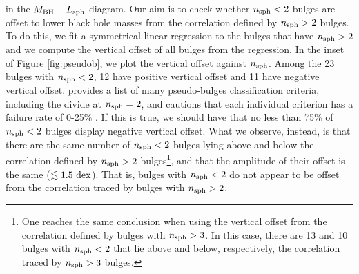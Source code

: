 \documentclass[preprint2]{emulateapj}
\begin{document}
in the $M_{\rm BH} - L_{\rm sph}$ diagram.
Our aim is to check whether $n_{\rm sph}<2$ bulges 
are offset to lower black hole masses from the correlation defined by $n_{\rm sph}>2$ bulges. 
To do this, we fit a symmetrical linear regression to the bulges that have $n_{\rm sph}>2$ 
and we compute the vertical offset of all bulges from the regression. 
In the inset of Figure \ref{fig:pseudob}, we plot the vertical offset against $n_{\rm sph}$. 
Among the 23 bulges with $n_{\rm sph}<2$, 12 have positive vertical offset and 11 have negative vertical offset. 
\cite{kormendy2015review} provides a list of many pseudo-bulges classification criteria, including the divide at $n_{\rm sph}=2$, 
and cautions that each individual criterion has a failure rate of 0-25\% \citep{fisherdrory2015}. 
If this is true, we should have that no less than 75\% of $n_{\rm sph}<2$ bulges display negative vertical offset. 
What we observe, instead, is that there are the same number of $n_{\rm sph}<2$ bulges lying above and below 
the correlation defined by $n_{\rm sph}>2$ bulges\footnote{One 
reaches the same conclusion when using the vertical offset from the correlation defined by bulges with $n_{\rm sph}>3$. 
In this case, there are 13 and 10 bulges with $n_{\rm sph}<2$ that lie above and below, respectively, the correlation  
traced by $n_{\rm sph}>3$ bulges.}, 
and that the amplitude of their offset is the same ($\lesssim 1.5\rm~dex$).
That is, bulges with $n_{\rm sph}<2$ do not appear to be offset from the correlation traced by bulges with $n_{\rm sph}>2$. 
\end{document}
